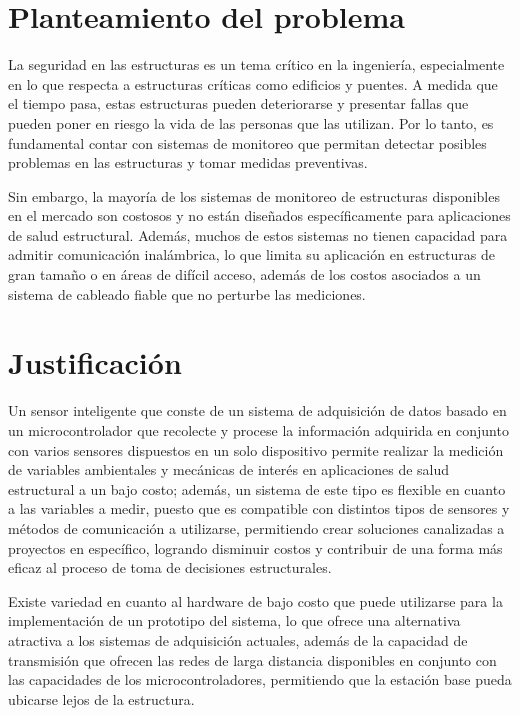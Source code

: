 \section{Planteamiento del problema}

La seguridad en las estructuras es un tema crítico en la ingeniería, especialmente en lo que respecta a estructuras críticas como edificios y puentes. A medida que el tiempo pasa, estas estructuras pueden deteriorarse y presentar fallas que pueden poner en riesgo la vida de las personas que las utilizan. Por lo tanto, es fundamental contar con sistemas de monitoreo que permitan detectar posibles problemas en las estructuras y tomar medidas preventivas.

Sin embargo, la mayoría de los sistemas de monitoreo de estructuras disponibles en el mercado son costosos y no están diseñados específicamente para aplicaciones de salud estructural. Además, muchos de estos sistemas no tienen capacidad para admitir comunicación inalámbrica, lo que limita su aplicación en estructuras de gran tamaño o en áreas de difícil acceso, además de los costos asociados a un sistema de cableado fiable que no perturbe las mediciones.

\section{Justificación}


Un sensor inteligente que conste de un sistema de adquisición de datos basado en un microcontrolador que recolecte y procese la información adquirida en conjunto con varios sensores dispuestos en un solo dispositivo permite realizar la medición de variables ambientales y mecánicas de interés en aplicaciones de salud estructural a un bajo costo; además, un sistema de este tipo es flexible en cuanto a las variables a medir, puesto que es compatible con distintos tipos de sensores y métodos de comunicación a utilizarse, permitiendo crear soluciones canalizadas a proyectos en específico, logrando disminuir costos y contribuir de una forma más eficaz al proceso de toma de decisiones estructurales.

Existe variedad en cuanto al hardware de bajo costo que puede utilizarse para la implementación de un prototipo del sistema, lo que ofrece una alternativa atractiva a los sistemas de adquisición actuales, además de la capacidad de transmisión que ofrecen las redes de larga distancia disponibles en conjunto con las capacidades de los microcontroladores, permitiendo que la estación base pueda ubicarse lejos de la estructura.

